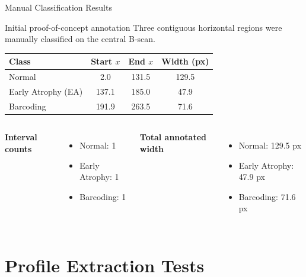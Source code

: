 \documentclass[aspectratio=169]{beamer}
\begin{document}
\begin{frame}{Manual Classification Results}

\begin{block}{Initial proof-of-concept annotation}
Three contiguous horizontal regions were manually classified on the central
B-scan.
\end{block}

\begin{table}
\centering
\small
\begin{tabular}{lccc}
\toprule
\textbf{Class} &
\textbf{Start $x$} &
\textbf{End $x$} &
\textbf{Width (px)} \\
\midrule
Normal &
2.0 &
131.5 &
129.5 \\
Early Atrophy (EA) &
137.1 &
185.0 &
47.9 \\
Barcoding &
191.9 &
263.5 &
71.6 \\
\bottomrule
\end{tabular}
\end{table}

\vspace{0.3cm}

\begin{columns}[T]


\textbf{Interval counts}

\begin{itemize}
    \item Normal: 1
    \item Early Atrophy: 1
    \item Barcoding: 1
\end{itemize}


\textbf{Total annotated width}

\begin{itemize}
    \item Normal: 129.5 px
    \item Early Atrophy: 47.9 px
    \item Barcoding: 71.6 px
\end{itemize}

\end{columns}

\end{frame}

\section{Profile Extraction Tests}
\end{document}
